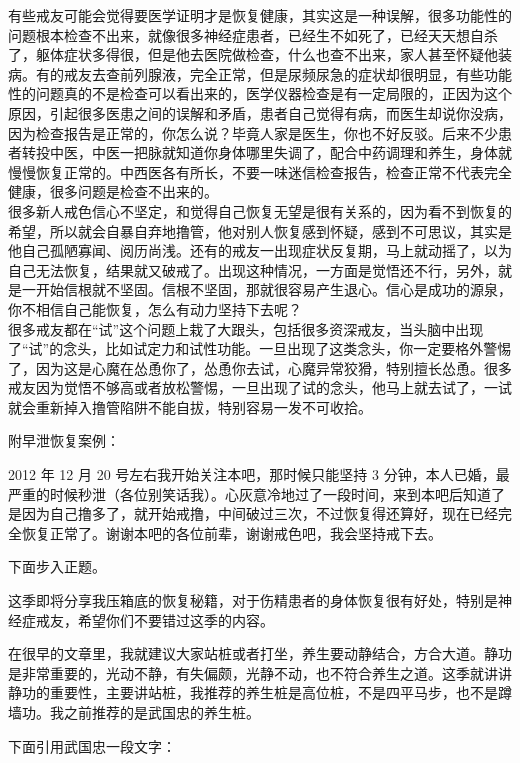 \begin{case}
    有些戒友可能会觉得要医学证明才是恢复健康，其实这是一种误解，很多功能性的问题根本检查不出来，就像很多神经症患者，已经生不如死了，已经天天想自杀了，躯体症状多得很，但是他去医院做检查，什么也查不出来，家人甚至怀疑他装病。有的戒友去查前列腺液，完全正常，但是尿频尿急的症状却很明显，有些功能性的问题真的不是检查可以看出来的，医学仪器检查是有一定局限的，正因为这个原因，引起很多医患之间的误解和矛盾，患者自己觉得有病，而医生却说你没病，因为检查报告是正常的，你怎么说？毕竟人家是医生，你也不好反驳。后来不少患者转投中医，中医一把脉就知道你身体哪里失调了，配合中药调理和养生，身体就慢慢恢复正常的。中西医各有所长，不要一味迷信检查报告，检查正常不代表完全健康，很多问题是检查不出来的。\\
    很多新人戒色信心不坚定，和觉得自己恢复无望是很有关系的，因为看不到恢复的希望，所以就会自暴自弃地撸管，他对别人恢复感到怀疑，感到不可思议，其实是他自己孤陋寡闻、阅历尚浅。还有的戒友一出现症状反复期，马上就动摇了，以为自己无法恢复，结果就又破戒了。出现这种情况，一方面是觉悟还不行，另外，就是一开始信根就不坚固。信根不坚固，那就很容易产生退心。信心是成功的源泉，你不相信自己能恢复，怎么有动力坚持下去呢？\\
    很多戒友都在“试”这个问题上栽了大跟头，包括很多资深戒友，当头脑中出现了“试”的念头，比如试定力和试性功能。一旦出现了这类念头，你一定要格外警惕了，因为这是心魔在怂恿你了，怂恿你去试，心魔异常狡猾，特别擅长怂恿。很多戒友因为觉悟不够高或者放松警惕，一旦出现了试的念头，他马上就去试了，一试就会重新掉入撸管陷阱不能自拔，特别容易一发不可收拾。
\end{case}

附早泄恢复案例：

\begin{case}
    2012 年 12 月 20 号左右我开始关注本吧，那时候只能坚持 3 分钟，本人已婚，最严重的时候秒泄（各位别笑话我）。心灰意冷地过了一段时间，来到本吧后知道了是因为自己撸多了，就开始戒撸，中间破过三次，不过恢复得还算好，现在已经完全恢复正常了。谢谢本吧的各位前辈，谢谢戒色吧，我会坚持戒下去。
\end{case}

下面步入正题。

这季即将分享我压箱底的恢复秘籍，对于伤精患者的身体恢复很有好处，特别是神经症戒友，希望你们不要错过这季的内容。

在很早的文章里，我就建议大家站桩或者打坐，养生要动静结合，方合大道。静功是非常重要的，光动不静，有失偏颇，光静不动，也不符合养生之道。这季就讲讲静功的重要性，主要讲站桩，我推荐的养生桩是高位桩，不是四平马步，也不是蹲墙功。我之前推荐的是武国忠的养生桩。

下面引用武国忠一段文字：


